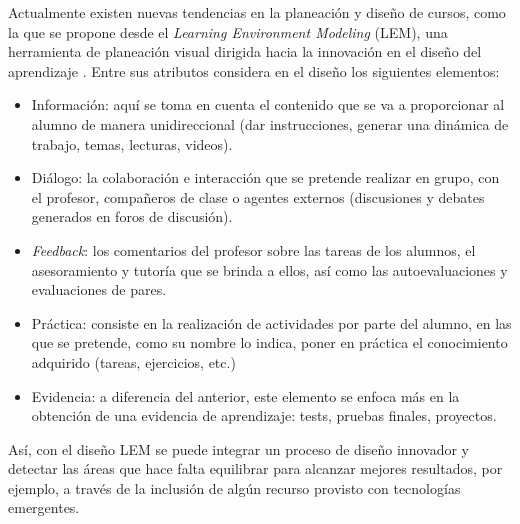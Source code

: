 \documentclass[spanish]{textolivre}
\begin{document}
Actualmente existen nuevas tendencias en la planeación y diseño de cursos, como la que se propone desde el \emph{Learning Environment Modeling} (LEM), una herramienta de planeación visual dirigida hacia la innovación en el diseño del aprendizaje \cite{ramirez-montoya2020}. Entre sus atributos considera en el diseño los siguientes elementos:

\begin{itemize}
    \item Información: aquí se toma en cuenta el contenido que se va a proporcionar al alumno de manera unidireccional (dar  instrucciones, generar una dinámica de trabajo, temas, lecturas, videos).
    \item Diálogo: la colaboración e interacción que se pretende realizar en grupo, con el profesor, compañeros de clase o agentes externos (discusiones y debates generados en foros de discusión).
    \item \emph{Feedback}: los comentarios del profesor sobre las tareas de los alumnos, el asesoramiento y tutoría que se brinda a ellos, así como las  autoevaluaciones y evaluaciones de pares.
    \item Práctica: consiste en la realización de actividades por parte del alumno, en las que se pretende, como su nombre lo indica, poner en práctica el conocimiento adquirido (tareas, ejercicios, etc.)
    \item Evidencia: a diferencia del anterior, este elemento se enfoca más en  la obtención de una evidencia de aprendizaje: tests, pruebas finales, proyectos.
\end{itemize}

Así, con el diseño LEM se puede integrar un proceso de diseño innovador y detectar las áreas que hace falta equilibrar para alcanzar mejores resultados, por ejemplo, a través de la inclusión de algún recurso provisto con tecnologías emergentes.
\end{document}
